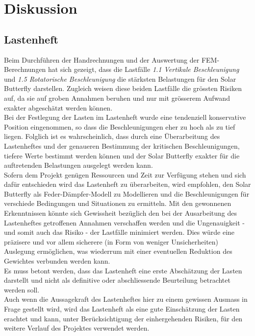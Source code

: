 \section{Diskussion}
\label{Diskussion}

\subsection{Lastenheft}
Beim Durchführen der Handrechnungen und der Auswertung der FEM-Berechnungen hat sich gezeigt, dass die Lastfälle \emph{1.1 Vertikale Beschleunigung} und \emph{1.5 Rotatorische Beschleunigung} die stärksten Belastungen für den Solar Butterfly darstellen. Zugleich weisen diese beiden Lastfälle die grössten Risiken auf, da sie auf groben Annahmen beruhen und nur mit grösserem Aufwand exakter abgeschätzt werden können.\\
Bei der Festlegung der Lasten im Lastenheft wurde eine tendenziell konservative Position eingenommen, so dass die Beschleunigungen eher zu hoch als zu tief liegen. Folglich ist es wahrscheinlich, dass durch eine Überarbeitung des Lastenheftes und der genaueren Bestimmung der kritischen Beschleunigungen, tiefere Werte bestimmt werden können und der Solar Butterfly exakter für die auftretenden Belastungen ausgelegt werden kann.\\
Sofern dem Projekt genügen Ressourcen und Zeit zur Verfügung stehen und sich dafür entschieden wird das Lastenheft zu überarbeiten, wird empfohlen, den Solar Butterfly als Feder-Dämpfer-Modell zu Modellieren und die Beschleunigungen für verschiede Bedingungen und Situationen zu ermitteln. Mit den gewonnenen Erkenntnissen könnte sich Gewissheit bezüglich den bei der Ausarbeitung des Lastenheftes getroffenen Annahmen verschaffen werden und die Ungenauigkeit - und somit auch das Risiko - der Lastfälle minimiert werden. Dies würde eine präzisere und vor allem sicherere (in Form von weniger Unsicherheiten) Auslegung ermöglichen, was wiederrum mit einer eventuellen Reduktion des Gewichtes verbunden werden kann.\\
Es muss betont werden, dass das Lastenheft eine erste Abschätzung der Lasten darstellt und nicht als definitive oder abschliessende Beurteilung betrachtet werden soll.\\
Auch wenn die Aussagekraft des Lastenheftes hier zu einem gewissen Ausmass in Frage gestellt wird, wird das Lastenheft als eine gute Einschätzung der Lasten erachtet und kann, unter Berücksichtigung der einhergehenden Risiken, für den weitere Verlauf des Projektes verwendet werden.

